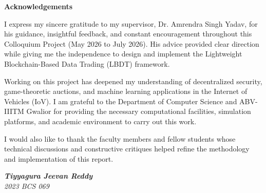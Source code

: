 \begin{center}
{\LARGE \bf Acknowledgements}
\end{center}
\noindent I express my sincere gratitude to my supervisor, Dr. Amrendra Singh Yadav, for his guidance, insightful feedback, and constant encouragement throughout this Colloquium Project (May 2026 to July 2026). His advice provided clear direction while giving me the independence to design and implement the Lightweight Blockchain-Based Data Trading (LBDT) framework.

Working on this project has deepened my understanding of decentralized security, game-theoretic auctions, and machine learning applications in the Internet of Vehicles (IoV). I am grateful to the Department of Computer Science and ABV-IIITM Gwalior for providing the necessary computational facilities, simulation platforms, and academic environment to carry out this work.

I would also like to thank the faculty members and fellow students whose technical discussions and constructive critiques helped refine the methodology and implementation of this report.

\vspace{1cm}
\begin{flushright}
\textit{\textbf{Tiyyagura Jeevan Reddy}}\\
\textit{2023 BCS 069}
\end{flushright}



